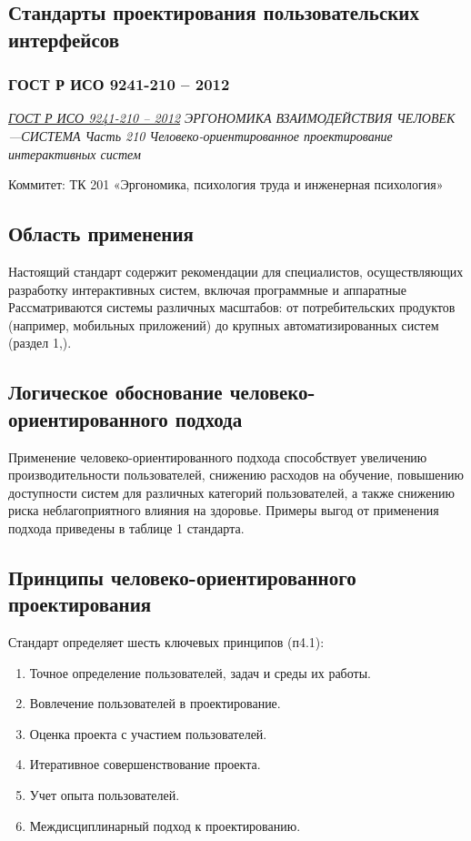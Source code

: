 \subsection{Стандарты проектирования пользовательских интерфейсов}

\subsubsection{ГОСТ Р ИСО 9241-210 -- 2012}

\emph{\href{https://meganorm.ru/Data/534/53476.pdf}{ГОСТ Р ИСО 9241-210 -- 2012}
ЭРГОНОМИКА ВЗАИМОДЕЙСТВИЯ
ЧЕЛОВЕК—СИСТЕМА
Часть 210
Человеко-ориентированное проектирование
интерактивных систем
}
\par
Коммитет:  ТК 201 «Эргономика, психология труда и инженерная психология»


\subsection*{Область применения}
Настоящий стандарт содержит рекомендации для специалистов, осуществляющих разработку интерактивных систем, включая программные и аппаратные
Рассматриваются системы различных масштабов: от потребительских продуктов (например, мобильных приложений) до крупных автоматизированных систем (раздел 1,).

\subsection*{Логическое обоснование человеко-ориентированного подхода}
Применение человеко-ориентированного подхода способствует увеличению производительности пользователей, снижению расходов
на обучение, повышению доступности систем для различных категорий пользователей, а также снижению риска неблагоприятного влияния на здоровье.
Примеры выгод от применения подхода приведены в таблице 1 стандарта.

\subsection*{Принципы человеко-ориентированного проектирования}
Стандарт определяет шесть ключевых принципов (п4.1):
\begin{enumerate}
    \item Точное определение пользователей, задач и среды их работы.
    \item Вовлечение пользователей в проектирование.
    \item Оценка проекта с участием пользователей.
    \item Итеративное совершенствование проекта.
    \item Учет опыта пользователей.
    \item Междисциплинарный подход к проектированию.
\end{enumerate}

